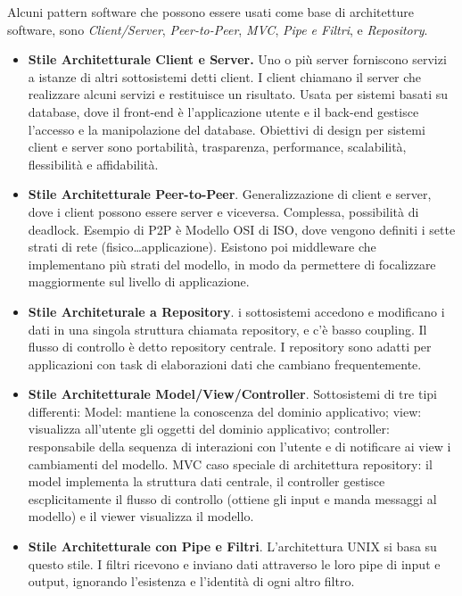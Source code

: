 \documentclass{article}
\begin{document}
        Alcuni pattern software che possono essere usati come base di architetture software, sono \textit{Client/Server}, \textit{Peer-to-Peer}, \textit{MVC}, \textit{Pipe e Filtri}, e \textit{Repository}.
        
        \begin{itemize}
            \item \textbf{Stile Architetturale Client e Server.} Uno o più server forniscono servizi a istanze di altri sottosistemi detti client. I client chiamano il server che realizzare alcuni servizi e restituisce un risultato. Usata per sistemi basati su database, dove il front-end è l’applicazione utente e il back-end gestisce l’accesso e la manipolazione del database. Obiettivi di design per sistemi client e server sono portabilità, trasparenza, performance, scalabilità, flessibilità e affidabilità.
            
            \item \textbf{Stile Architetturale Peer-to-Peer}. Generalizzazione di client e server, dove i client possono essere server e viceversa. Complessa, possibilità di deadlock. Esempio di P2P è Modello OSI di ISO, dove vengono definiti i sette strati di rete (fisico…applicazione). Esistono poi middleware che implementano più strati del modello, in modo da permettere di focalizzare maggiormente sul livello di applicazione.
            
            \item \textbf{Stile Architeturale a Repository}. i sottosistemi accedono e modificano i dati in una singola struttura chiamata repository, e c’è basso coupling. Il flusso di controllo è detto repository centrale. I repository sono adatti per applicazioni con task di elaborazioni dati che cambiano frequentemente.
            
            \item \textbf{Stile Architetturale Model/View/Controller}. Sottosistemi di tre tipi differenti:
            Model: mantiene la conoscenza del dominio applicativo; view: visualizza all’utente gli oggetti del dominio applicativo; controller: responsabile della sequenza di interazioni con l’utente e di notificare ai view i cambiamenti del modello. MVC caso speciale di architettura repository: il model implementa la struttura dati centrale, il controller gestisce escplicitamente il flusso di controllo (ottiene gli input e manda messaggi al modello) e il viewer visualizza il modello.
            
            \item \textbf{Stile Architetturale con Pipe e Filtri}. L'architettura UNIX si basa su questo stile. I filtri ricevono e inviano dati attraverso le loro pipe di input e output, ignorando l’esistenza e l’identità di ogni altro filtro.
        
        \end{itemize}
    
\end{document}
